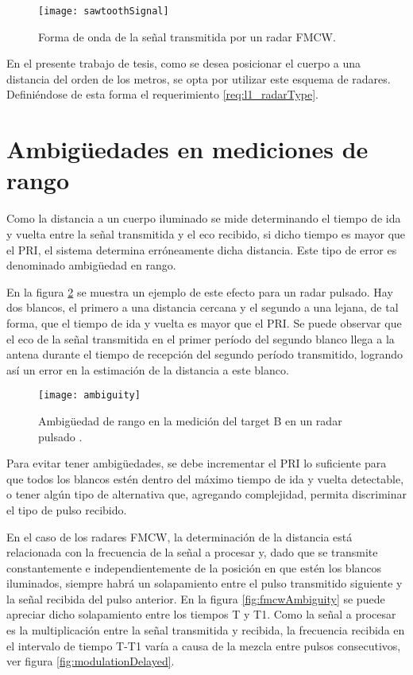 \begin{figure}[H]
 \centering
 \texttt{[image: sawtoothSignal]}
 \caption{Forma de onda de la señal transmitida por un radar FMCW.}
 \label{fig:continuousWaveform}
\end{figure}

En el presente trabajo de tesis, como se desea posicionar el cuerpo a una distancia del orden de los metros, se opta por utilizar este esquema de radares. Definiéndose de esta forma el requerimiento \ref{req:l1_radarType}.


\section{Ambigüedades en mediciones de rango} \label{sc:ambiguity}

Como la distancia a un cuerpo iluminado se mide determinando el tiempo de ida y vuelta entre la señal transmitida y el eco recibido, si dicho tiempo es mayor que el PRI, el sistema determina erróneamente dicha distancia. Este tipo de error es denominado ambigüedad en rango.

En la figura \ref{fig:ambiguity} se muestra un ejemplo de este efecto para un radar pulsado. Hay dos blancos, el primero a una distancia cercana y el segundo a una lejana, de tal forma, que el tiempo de ida y vuelta es mayor que el PRI. Se puede observar que el eco de la señal transmitida en el primer período del segundo blanco llega a la antena durante el tiempo de recepción del segundo período transmitido, logrando así un error en la estimación de la distancia a este blanco.

\begin{figure}[H]
 \centering
 \texttt{[image: ambiguity]}
 \caption{Ambigüedad de rango en la medición del target B en un radar pulsado \cite{Richards2010}.}
 \label{fig:ambiguity}
\end{figure}

Para evitar tener ambigüedades, se debe incrementar el PRI lo suficiente para que todos los blancos estén dentro del máximo tiempo de ida y vuelta detectable, o tener algún tipo de alternativa que, agregando complejidad, permita discriminar el tipo de pulso recibido.

En el caso de los radares FMCW, la determinación de la distancia está relacionada con la frecuencia de la señal a procesar y, dado que se transmite constantemente e independientemente de la posición en que estén los blancos iluminados, siempre habrá un solapamiento entre el pulso transmitido siguiente y la señal recibida del pulso anterior. En la figura \ref{fig:fmcwAmbiguity} se puede apreciar dicho solapamiento entre los tiempos T y T1. Como la señal a procesar es la multiplicación entre la señal transmitida y recibida, la frecuencia recibida en el intervalo de tiempo T-T1 varía a causa de la mezcla entre pulsos consecutivos, ver figura \ref{fig:modulationDelayed}.

